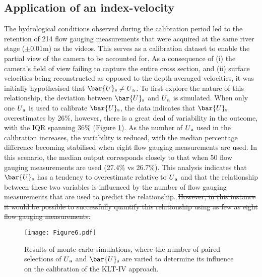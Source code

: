 \documentclass[hess, manuscript]{copernicus} %
\providecommand{\DIFdel}[1]{{\protect\color{red}\sout{#1}}} %
\providecommand{\DIFdelbegin}{} %
\providecommand{\DIFdelend}{} %
\newcommand{\DIFscaledelfig}{0.5}
\newlength{\DIFdelgraphicswidth} %
\newlength{\DIFdelgraphicsheight} %
\newcommand{\DIFdelincludegraphics}[2][]{%
\sbox{\DIFdelgraphicsbox}{\DIFOincludegraphics[#1]{#2}}%
\settoboxwidth{\DIFdelgraphicswidth}{\DIFdelgraphicsbox} %
\settoboxtotalheight{\DIFdelgraphicsheight}{\DIFdelgraphicsbox} %
\scalebox{\DIFscaledelfig}{%
\parbox[b]{\DIFdelgraphicswidth}{\usebox{\DIFdelgraphicsbox}\\[-\baselineskip] \rule{\DIFdelgraphicswidth}{0em}}\llap{\resizebox{\DIFdelgraphicswidth}{\DIFdelgraphicsheight}{%
\setlength{\unitlength}{\DIFdelgraphicswidth}%
\begin{picture}(1,1)%
\thicklines\linethickness{2pt} %
{\color[rgb]{1,0,0}\put(0,0){\framebox(1,1){}}}%
{\color[rgb]{1,0,0}\put(0,0){\line( 1,1){1}}}%
{\color[rgb]{1,0,0}\put(0,1){\line(1,-1){1}}}%
\end{picture}%
}\hspace*{3pt}}} %
} %
\DeclareRobustCommand{\DIFdelbegin}{\DIFOdelbegin \let\includegraphics\DIFdelincludegraphics} %
\DeclareRobustCommand{\DIFdelend}{\DIFOaddend \let\includegraphics\DIFOincludegraphics} %
\begin{document}
\FloatBarrier

\subsection{Application of an index-velocity}

The hydrological conditions observed during the calibration period led to the retention of 214 flow gauging measurements that were acquired at the same river stage ($\pm{0.01}$m) as the videos. This serves as a calibration dataset to enable the partial view of the camera to be accounted for. As a consequence of (i) the camera's field of view failing to capture the entire cross section, and (ii) surface velocities being reconstructed as opposed to the depth-averaged velocities, it was initially hypothesised that ${\bar{U}\textsubscript{s}} \neq U\textsubscript{a}$. To first explore the nature of this relationship, the deviation between $\bar{U}\textsubscript{s}$ and $U\textsubscript{a}$ is simulated. When only one $U\textsubscript{a}$ is used to calibrate $\bar{U}\textsubscript{s}$, the data indicates that $\bar{U}\textsubscript{s}$ overestimates by 26\%, however, there is a great deal of variability in the outcome, with the IQR spanning 36\% (Figure \ref{Figure6}). As the number of $U\textsubscript{a}$ used in the calibration increases, the variability is reduced, with the median percentage difference becoming stabilised when eight flow gauging measurements are used. In this scenario, the median output corresponds closely to that when 50 flow gauging measurements are used (27.4\% vs 26.7\%). This analysis indicates that $\bar{U}\textsubscript{s}$ has a tendency to overestimate relative to $U\textsubscript{a}$ and that the relationship between these two variables is influenced by the number of flow gauging measurements that are used to predict the relationship.
\DIFdelbegin \DIFdel{However, in this instance it would be possible to successfully quantify this relationship using as few as eight flow gauging measurements.
}\DIFdelend 

\begin{figure}[!htb]
\centering 
\texttt{[image: Figure6.pdf]}
\caption{Results of monte-carlo simulations, where the number of paired selections of $U\textsubscript{a}$ and $\bar{U}\textsubscript{s}$ are varied to determine its influence on the calibration of the KLT-IV approach.}
\label{Figure6} 
\end{figure}

\DIFdelbegin %
\DIFdelend %
\end{document}
